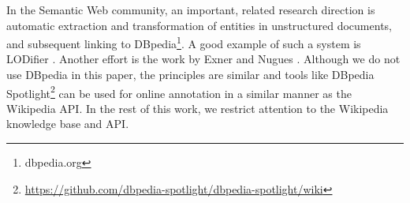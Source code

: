 In the Semantic Web community, an important, related research direction is automatic extraction and transformation of entities in unstructured documents, and subsequent linking to DBpedia\footnote{dbpedia.org}. A good example of such a system is LODifier \cite{lodifier}. Another effort is the work by Exner and Nugues \cite{extraction}. Although we do not use DBpedia in this paper, the principles are similar and tools like DBpedia Spotlight\footnote{\url{https://github.com/dbpedia-spotlight/dbpedia-spotlight/wiki}} can be used for online annotation in a similar manner as the Wikipedia API. In the rest of this work, we restrict attention to the Wikipedia knowledge base and API. 
